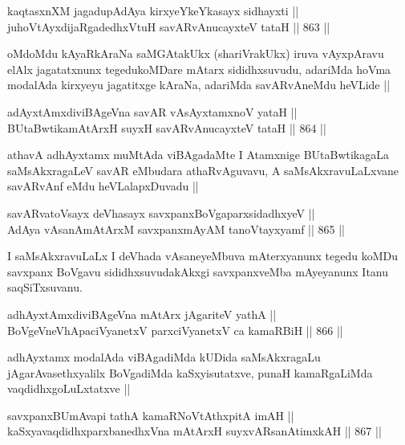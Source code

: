 \begin{shl}
kaqtasxnXM jagadupAdAya kirxyeYkeYkasayx sidhayxti || \\
juhoVtAyxdijaRgadedhxVtuH savARvAnucayxteV tataH ||  863 || 
\end{shl}

\begin{artha}
oMdoMdu kAyaRkAraNa saMGAtakUkx (shariVrakUkx) iruva vAyxpAravu elAlx jagatatxnunx tegedukoMDare mAtarx sididhxsuvudu, adariMda hoVma modalAda kirxyeyu jagatitxge kAraNa, adariMda savARvAneMdu heVLide ||
\end{artha}


\begin{shl}
adAyxtAmxdiviBAgeVna savAR vA\s sAyx\s \s tamxnoV yataH || \\
BUtaBwtikamAtArxH suyxH savARvAnucayxteV tataH ||  864 ||  
\end{shl}

\begin{artha}
athavA adhAyxtamx muMtAda viBAgadaMte I Atamxnige BUtaBwtikagaLa saMsAkxragaLeV savAR eMbudara athaRvAguvavu, A saMsAkxravuLaLxvane savARvAnf eMdu heVLalapxDuvadu ||
\end{artha}

\begin{shl}
savARvatoV\s sayx deVhasayx savxpanxBoVgaparxsidadhxyeV || \\
AdAya vAsanAmAtArxM savxpanxmAyAM tanoVtayxyamf ||  865 ||  
\end{shl}

\begin{artha}
I saMsAkxravuLaLx I deVhada vAsaneyeMbuva mAterxyanunx tegedu koMDu savxpanx BoVgavu sididhxsuvudakAkxgi savxpanxveMba mAyeyanunx Itanu saqSiTxsuvanu.
\end{artha}

\begin{shl}
adhAyxtAmxdiviBAgeVna mAtArx jAgariteV yathA || \\
BoVgeVneVhApaciVyanetxV parxciVyanetxV ca kamaRBiH ||  866 || 
\end{shl}

\begin{artha}
adhAyxtamx modalAda viBAgadiMda kUDida saMsAkxragaLu jAgarAvasethxyalilx BoVgadiMda kaSxyisutatxve, punaH kamaRgaLiMda vaqdidhxgoLuLxtatxve ||
\end{artha}

\begin{shl}
savxpanxBUmAvapi tathA kamaRNoVtAthxpitA imAH || \\
kaSxyavaqdidhxparxbanedhxVna mAtArxH suyxvARsanAtimxkAH ||  867 ||  
\end{shl}

